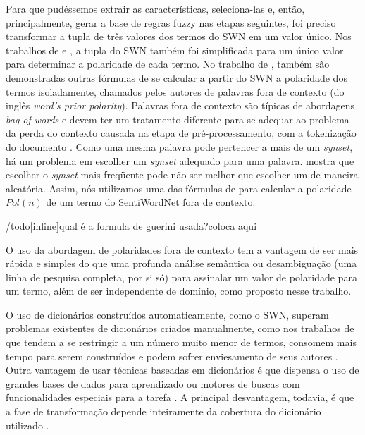 \documentclass[template.tex]{subfiles}
\begin{document}
Para que pudéssemos extrair as características, seleciona-las e, então, principalmente, gerar a base de regras fuzzy nas etapas seguintes, foi preciso transformar a tupla de três valores dos termos do SWN em um valor único. Nos trabalhos de  e , a tupla do SWN também foi simplificada para um único valor para determinar a polaridade de cada termo. No trabalho de , também são demonstradas outras fórmulas de se calcular a partir do SWN a polaridade dos termos isoladamente, chamados pelos autores de palavras fora de contexto (do inglês \textit{word’s prior polarity}). Palavras fora de contexto são típicas de abordagens \textit{bag-of-words} e devem ter um tratamento diferente para se adequar ao problema da perda do contexto causada na etapa de pré-processamento, com a tokenização do documento \cite{guerini2013sentiment}. Como uma mesma palavra pode pertencer a mais de um \textit{synset}, há um problema em escolher um \textit{synset} adequado para uma palavra.  mostra que escolher o \textit{synset} mais freqüente pode não ser melhor que escolher um de maneira aleatória. Assim, nós utilizamos uma das fórmulas de  para calcular a polaridade $Pol(n)$ de um termo do SentiWordNet fora de contexto. 

/todo[inline]{qual é a formula de guerini usada?coloca aqui}

O uso da abordagem de polaridades fora de contexto tem a vantagem de ser mais rápida e simples do que uma profunda análise semântica ou desambiguação (uma linha de pesquisa completa, por si só) para assinalar um valor de polaridade para um termo, além de ser independente de domínio, como proposto nesse trabalho. 

O uso de dicionários construídos automaticamente, como o SWN, superam problemas existentes de dicionários criados manualmente, como nos trabalhos de  que tendem a se restringir a um número muito menor de termos, consomem mais tempo para serem construídos e podem sofrer enviesamento de seus autores \cite{ohana2009sentiment}. Outra vantagem de usar técnicas baseadas em dicionários é que dispensa o uso de grandes bases de dados para aprendizado ou motores de buscas com funcionalidades especiais para a tarefa \cite{khan2011sentiment}. A principal desvantagem, todavia, é que a fase de  transformação depende inteiramente da cobertura do dicionário utilizado \cite{khan2011sentiment}. 
\end{document}
